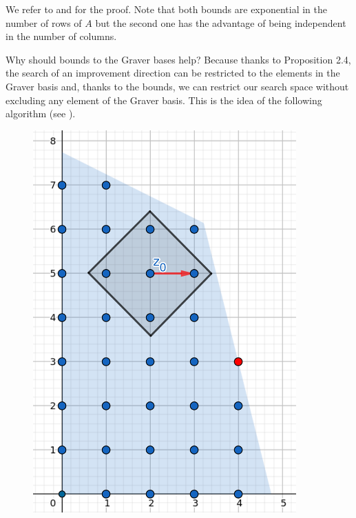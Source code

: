 We refer to \cite{ONN:2010} and \cite{EISENBRAND:2018} for the proof. Note that both bounds are exponential in the number of rows of $A$ but the second one has the advantage of being independent in the number of columns. 

Why should bounds to the Graver bases help? Because thanks to Proposition 2.4, the search of an improvement direction can be restricted to the elements in the Graver basis and, thanks to the bounds, we can restrict our search space without excluding any element of the Graver basis. This is the idea of the following algorithm (see \cite{HEMMECKE:2011}).


\vspace{10pt}
\begin{figure}[h]
\centering
\begin{minipage}[b]{0.45\textwidth}
    \centering
    \includegraphics[width=0.9\textwidth]{images/IP(6).png}

\end{minipage}
\end{figure}
